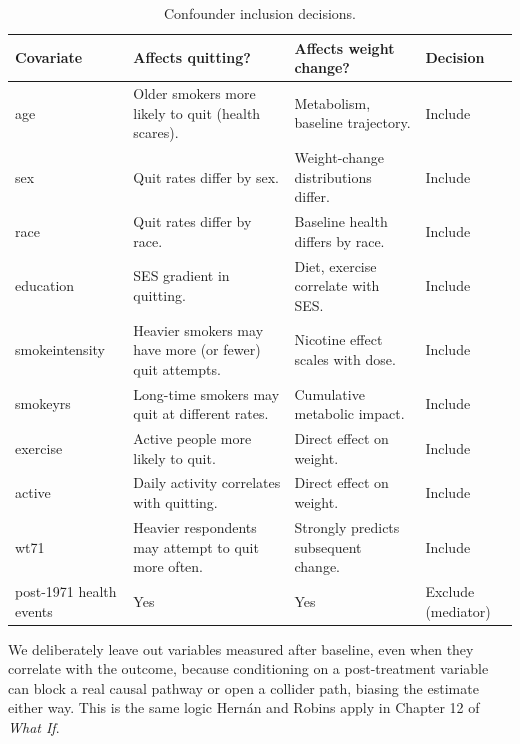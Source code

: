 \documentclass[11pt]{article}
\begin{document}
\begin{table}[H]
\centering
\small
\begin{tabular}{@{}>{\ttfamily}l p{4.4cm} p{4.4cm} l@{}}
\toprule
\rmfamily Covariate & Affects quitting? & Affects weight change? & Decision \\
\midrule
age              & Older smokers more likely to quit (health scares).             & Metabolism, baseline trajectory.        & Include \\
sex              & Quit rates differ by sex.                                       & Weight-change distributions differ.     & Include \\
race             & Quit rates differ by race.                                      & Baseline health differs by race.        & Include \\
education        & SES gradient in quitting.                                       & Diet, exercise correlate with SES.      & Include \\
smokeintensity   & Heavier smokers may have more (or fewer) quit attempts.         & Nicotine effect scales with dose.       & Include \\
smokeyrs         & Long-time smokers may quit at different rates.                  & Cumulative metabolic impact.            & Include \\
exercise         & Active people more likely to quit.                              & Direct effect on weight.                & Include \\
active           & Daily activity correlates with quitting.                        & Direct effect on weight.                & Include \\
wt71             & Heavier respondents may attempt to quit more often.             & Strongly predicts subsequent change.    & Include \\
\rmfamily post-1971 health events & Yes & Yes & \rmfamily Exclude (mediator) \\
\bottomrule
\end{tabular}
\caption{Confounder inclusion decisions.}
\end{table}

We deliberately leave out variables measured after baseline, even when they
correlate with the outcome, because conditioning on a post-treatment
variable can block a real causal pathway or open a collider path, biasing
the estimate either way. This is the same logic Hern\'an and Robins apply
in Chapter 12 of \textit{What If}.
\end{document}
